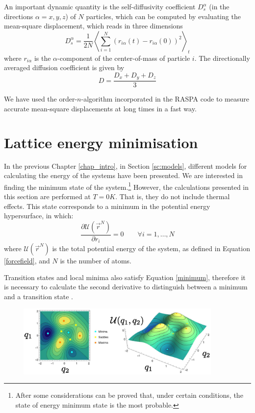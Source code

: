 An important dynamic quantity is the self-diffusivity coefficient $D^\alpha_s$ (in the directions $\alpha=x,y,z$) of $N$ particles, which can be computed by evaluating the mean-square displacement, which reads in three dimensions
\begin{equation}
\label{eq:msd}
D_s^\alpha=\frac{1}{2N}\left\langle \sum_{i=1}^N{\left(r_{i\alpha}(t)-r_{i\alpha}(0)\right)^2}\right\rangle_t
\end{equation} where $r_{i\alpha}$ is the $\alpha$-component of the center-of-mass of particle $i$. The directionally averaged diffusion coefficient is given by
\begin{equation}
\label{eq:diffusion}
D=\frac{D_x+D_y+D_z}{3}
\end{equation}

We have used the order-$n$-algorithm incorporated in the RASPA code \cite{Dubbeldam2009,RASPA_code} to measure accurate mean-square displacements at long times in a fast way.

\section{Lattice energy minimisation}
In the previous Chapter \ref{chap_intro}, in Section \ref{sc:models}, different models for calculating the energy of the systems have been presented. We are interested in finding the minimum state of the system.\footnote{After some considerations can be proved that, under certain conditions, the state of energy minimum state is the most probable.} However, the calculations presented in this section are performed at $T=0 K$. That is, they do not include thermal effects. This state corresponds to a minimum in the potential energy hypersurface, in which:
\begin{equation}
\label{minimum}
\frac{\partial\mathcal{U}(\vec{r}^N)}{\partial r_i}=0\qquad \forall i=1,\ldots,N
\end{equation} where $\mathcal{U}(\vec{r}^N)$ is the total potential energy of the system, as defined in Equation \ref{forcefield}, and $N$ is the number of atoms.

Transition states and local minima also satisfy Equation \ref{minimum}, therefore it is necessary to calculate the second derivative to distinguish between a minimum and a transition state .
\begin{figure}[ht]
  \centering
  \includegraphics[width=0.9\textwidth]{./methodology/PES.eps}
  \caption{
  \label{fgr:PES}
  }
\end{figure}

